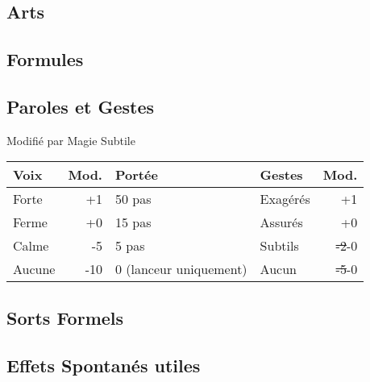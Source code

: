 \subsection*{Arts}

\magusArtsLong

\subsection*{Formules}
\begin{multicols}{2}
\castingformulas

\begin{small}
\end{small}

\end{multicols}
\subsection*{Paroles et Gestes}
Modifié par Magie Subtile

\begin{tabularx}{\textwidth}{|X|r|l||X|r|}
\hline
Voix   & Mod. & Portée                          & Gestes   & Mod. \\ \hline
Forte  &  +1  & 50 pas                          & Exagérés & +1 \\
Ferme  &  +0  & 15 pas                          & Assurés  & +0 \\
Calme  &  -5  & 5 pas                           & Subtils  & \sout{-2}-0 \\
Aucune & -10  & 0 {\small (lanceur uniquement)} & Aucun    & \sout{-5}-0 \\ \hline
\end{tabularx}
\pagebreak
\subsection*{Sorts Formels}
\begin{multicols}{2}
\longspells
\end{multicols}
\subsection*{Effets Spontanés utiles}

\begin{multicols}{2}

\end{multicols}

